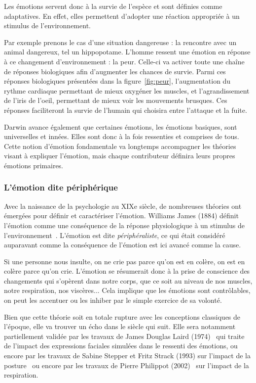 Les émotions servent donc à la survie de l’espèce et sont définies comme adaptatives. En effet, elles permettent d'adopter une réaction appropriée à un stimulus de l'environnement.

Par exemple prenons le cas d'une situation dangereuse : la rencontre avec un animal dangereux, tel un hippopotame. L'homme ressent une émotion en réponse à ce changement d'environnement : la peur. Celle-ci va activer toute une chaîne de réponses biologiques afin d'augmenter les chances de survie. Parmi ces réponses biologiques présentées dans la figure~\ref{fig:peur}, l'augmentation du rythme cardiaque permettant de mieux oxygéner les muscles, et l'agrandissement de l'iris de l'oeil, permettant de mieux voir les mouvements brusques. Ces réponses faciliteront la survie de l'humain qui choisira entre l'attaque et la fuite.



Darwin avance également que certaines émotions, les émotions basiques, sont universelles et innées. Elles sont donc à la fois ressenties et comprises de tous. Cette notion d'émotion fondamentale va longtemps accompagner les théories visant à expliquer l'émotion, mais chaque contributeur définira leurs propres émotions primaires.

\subsubsection{L'émotion dite périphérique}
Avec la naissance de la psychologie au XIXe siècle, de nombreuses théories ont émergées pour définir et caractériser l'émotion. Williams James (1884) définit l'émotion comme une conséquence de la réponse physiologique à un stimulus de l'environnement~\cite{James1884}. L'émotion est dite \textit{périphéraliste}, ce qui était considéré auparavant comme la conséquence de l’émotion est ici avancé comme la cause.

Si une personne nous insulte, on ne crie pas parce qu'on est en colère, on est en colère parce qu'on crie. L'émotion se résumerait donc à la prise de conscience des changements qui s'opèrent dans notre corps, que ce soit au niveau de nos muscles, notre respiration, nos viscères... Cela implique que les émotions sont contrôlables, on peut les accentuer ou les inhiber par le simple exercice de sa volonté.

Bien que cette théorie soit en totale rupture avec les conceptions classiques de l'époque, elle va trouver un écho dans le siècle qui suit. Elle sera notamment partiellement validée par les travaux de James Douglas Laird (1974)~\cite{Laird1974} qui traite de l'impact des expressions faciales simulées dans le ressenti des émotions, ou encore par les travaux de Sabine Stepper et Fritz Strack (1993) sur l'impact de la posture~\cite{Stepper1993} ou encore par les travaux de Pierre Philippot (2002)~\cite{Philippot2002} sur l'impact de la respiration.


